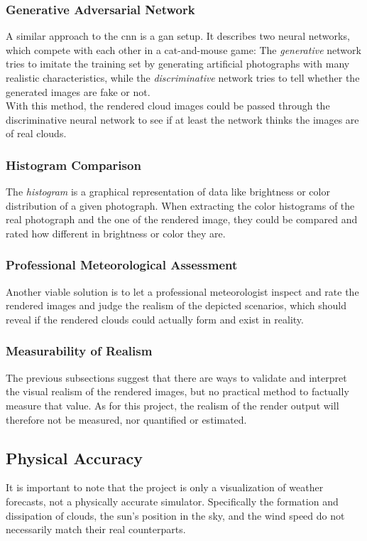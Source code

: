 \subsubsection{Generative Adversarial Network}
A similar approach to the \gls{cnn} is a \gls{gan} setup. It describes two neural networks, which compete with each other in a cat-and-mouse game: The \textit{generative} network tries to imitate the training set by generating artificial photographs with many realistic characteristics, while the \emph{discriminative} network tries to tell whether the generated images are fake or not.
\\
With this method, the rendered cloud images could be passed through the discriminative neural network to see if at least the network thinks the images are of real clouds.

\subsubsection{Histogram Comparison}
The \textit{\gls{histogram}} is a graphical representation of data like brightness or color distribution of a given photograph.
When extracting the color \gls{histogram}s of the real photograph and the one of the rendered image, they could be compared and rated how different in brightness or color they are.

\subsubsection{Professional Meteorological Assessment}
Another viable solution is to let a professional meteorologist inspect and rate the rendered images and judge the realism of the depicted scenarios, which should reveal if the rendered clouds could actually form and exist in reality.

\subsubsection{Measurability of Realism}
\label{section:eval:measurability}
The previous subsections suggest that there are ways to validate and interpret the visual realism of the rendered images, but no practical method to factually measure that value.
As for this project, the realism of the render output will therefore not be measured, nor quantified or estimated.

\subsection{Physical Accuracy}
It is important to note that the project is only a visualization of weather forecasts, not a physically accurate simulator.
Specifically the formation and dissipation of clouds, the sun's position in the sky, and the wind speed do not necessarily match their real counterparts.

